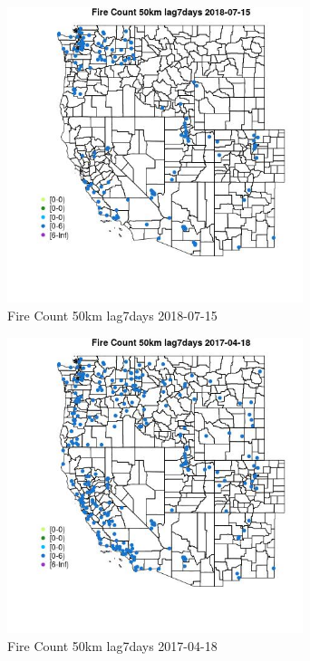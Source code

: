 \begin{figure} 
\centering  
\includegraphics[width=0.77\textwidth]{Code_Outputs/Report_ML_input_PM25_Step4_part_e_de_duplicated_aves_compiled_2019-05-21wNAs_MapObsFire_Count_50km_lag7days2018-07-15.jpg} 
\caption{\label{fig:Report_ML_input_PM25_Step4_part_e_de_duplicated_aves_compiled_2019-05-21wNAsMapObsFire_Count_50km_lag7days2018-07-15}Fire Count 50km lag7days 2018-07-15} 
\end{figure} 
 

\begin{figure} 
\centering  
\includegraphics[width=0.77\textwidth]{Code_Outputs/Report_ML_input_PM25_Step4_part_e_de_duplicated_aves_compiled_2019-05-21wNAs_MapObsFire_Count_50km_lag7days2017-04-18.jpg} 
\caption{\label{fig:Report_ML_input_PM25_Step4_part_e_de_duplicated_aves_compiled_2019-05-21wNAsMapObsFire_Count_50km_lag7days2017-04-18}Fire Count 50km lag7days 2017-04-18} 
\end{figure} 
 

